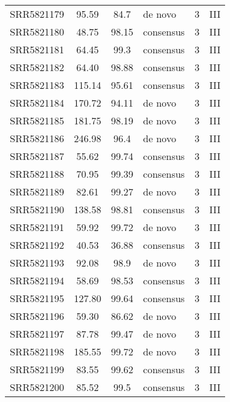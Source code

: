 \begin{scriptsize}
\begin{center}
\begin{longtable}{@{}lcclcc@{}}
SRR5821179 & 95.59         & 84.7        & de novo      & 3        & III      \\
SRR5821180 & 48.75         & 98.15       & consensus    & 3        & III      \\
SRR5821181 & 64.45         & 99.3        & consensus    & 3        & III      \\
SRR5821182 & 64.40         & 98.88       & consensus    & 3        & III      \\
SRR5821183 & 115.14        & 95.61       & consensus    & 3        & III      \\
SRR5821184 & 170.72        & 94.11       & de novo      & 3        & III      \\
SRR5821185 & 181.75        & 98.19       & de novo      & 3        & III      \\
SRR5821186 & 246.98        & 96.4        & de novo      & 3        & III      \\
SRR5821187 & 55.62         & 99.74       & consensus    & 3        & III      \\
SRR5821188 & 70.95         & 99.39       & consensus    & 3        & III      \\
SRR5821189 & 82.61         & 99.27       & de novo      & 3        & III      \\
SRR5821190 & 138.58        & 98.81       & consensus    & 3        & III      \\
SRR5821191 & 59.92         & 99.72       & de novo      & 3        & III      \\
SRR5821192 & 40.53         & 36.88       & consensus    & 3        & III      \\
SRR5821193 & 92.08         & 98.9        & de novo      & 3        & III      \\
SRR5821194 & 58.69         & 98.53       & consensus    & 3        & III      \\
SRR5821195 & 127.80        & 99.64       & consensus    & 3        & III      \\
SRR5821196 & 59.30         & 86.62       & de novo      & 3        & III      \\
SRR5821197 & 87.78         & 99.47       & de novo      & 3        & III      \\
SRR5821198 & 185.55        & 99.72       & de novo      & 3        & III      \\
SRR5821199 & 83.55         & 99.62       & consensus    & 3        & III      \\
SRR5821200 & 85.52         & 99.5        & consensus    & 3        & III      \\

\end{longtable}
\end{center}
\end{scriptsize}
